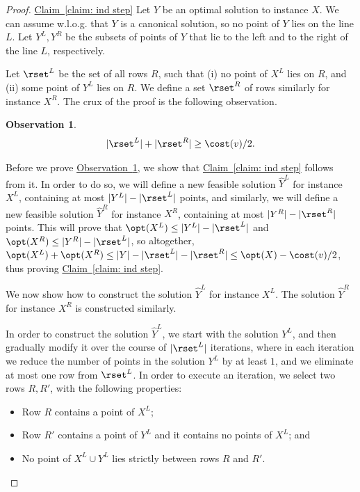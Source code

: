 \documentclass[11pt]{article}
\numberwithin{equation}{section}
\theoremstyle{definition}
\theoremstyle{plain}
\newcommand{\expref}[2]{\hyperref[#2]{#1~\ref{#2}}}
\newtheorem{myobs}[theorem]{Observation}
\begin{document}
\begin{proof}{\expref{Claim}{claim: ind step}}
	Let $Y$ be an optimal solution to instance $X$. We can assume w.l.o.g. that $Y$ is a canonical solution, so no point of $Y$ lies on the line $L$. Let $Y^L,Y^R$ be the subsets of points of $Y$ that lie to the left and to the right of the line $L$, respectively.
	
Let $\rset^L$ be the set of all rows $R$, such that (i) no point of $X^L$ lies on $R$, and (ii) some point of $Y^L$ lies on $R$. We define a set $\rset^R$ of rows similarly for instance $X^R$. The crux of the proof is the following observation.

\begin{myobs}\label{obs number of inactive rows with points}
\[	|\rset^L|+|\rset^R|\geq \cost(v)/2.\]
\end{myobs}

Before we	prove \expref{Observation}{obs number of inactive rows with points}, we show that \expref{Claim}{claim: ind step} follows from it. In order to do so, we will define a new feasible solution $\hat Y^L$ for instance $X^L$, containing at most $|Y^L|-|\rset^L|$ points, and similarly, we will define a new feasible solution $\hat Y^R$ for instance $X^R$, containing at most $|Y^R|-|\rset^R|$ points. This will prove that $\opt(X^L)\leq |Y^L|-|\rset^L|$ and $\opt(X^R)\leq |Y^R|-|\rset^L|$, so altogether, $\opt(X^L)+\opt(X^R) \leq |Y|-|\rset^L|-|\rset^R|\leq \opt(X)-\cost(v)/2$, thus proving \expref{Claim}{claim: ind step}.

We now show how to construct the solution $\hat Y^L$ for instance $X^L$. The solution $\hat Y^R$ for instance $X^R$ is constructed similarly.

In order to construct the solution $\hat Y^L$, we start with the solution $Y^L$, and then gradually modify it over the course of $|\rset^L|$ iterations, where in each iteration we reduce the number of points in the solution $Y^L$ by at least $1$, and we eliminate at most one row from $\rset^L$. In order to execute an iteration, we select two rows $R,R'$, with the following properties:

\begin{itemize}
	\item Row $R$ contains a point of $X^L$;
	\item Row $R'$ contains a point of $Y^L$ and it contains no points of $X^L$; and
	\item No point of $X^L\cup Y^L$ lies strictly between  rows $R$ and $R'$.
\end{itemize}


\end{proof}
\end{document}
